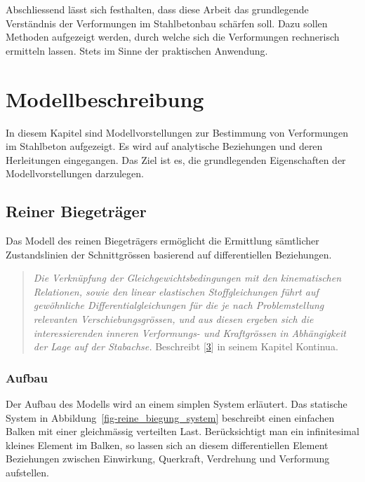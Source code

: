 \documentclass[
  12pt,
  letterpaper,
  egregdoesnotlikesansseriftitles]{scrreprt}
\begin{document}
Abschliessend lässt sich festhalten, dass diese Arbeit das grundlegende
Verständnis der Verformungen im Stahlbetonbau schärfen soll. Dazu sollen
Methoden aufgezeigt werden, durch welche sich die Verformungen
rechnerisch ermitteln lassen. Stets im Sinne der praktischen Anwendung.


\hypertarget{sec-modellbeschrieb}{%
\chapter{Modellbeschreibung}\label{sec-modellbeschrieb}}

In diesem Kapitel sind Modellvorstellungen zur Bestimmung von
Verformungen im Stahlbeton aufgezeigt. Es wird auf analytische
Beziehungen und deren Herleitungen eingegangen. Das Ziel ist es, die
grundlegenden Eigenschaften der Modellvorstellungen darzulegen.

\hypertarget{sec-kontinua}{%
\section{Reiner Biegeträger}\label{sec-kontinua}}

Das Modell des reinen Biegeträgers ermöglicht die Ermittlung sämtlicher
Zustandslinien der Schnittgrössen basierend auf differentiellen
Beziehungen.

\begin{quote}
\emph{Die Verknüpfung der Gleichgewichtsbedingungen mit den
kinematischen Relationen, sowie den linear elastischen Stoffgleichungen
führt auf gewöhnliche Differentialgleichungen für die je nach
Problemstellung relevanten Verschiebungsgrössen, und aus diesen ergeben
sich die interessierenden inneren Verformungs- und Kraftgrössen in
Abhängigkeit der Lage auf der Stabachse.} Beschreibt
{[}\protect\hyperlink{ref-Marti}{3}{]} in seinem Kapitel Kontinua.
\end{quote}

\hypertarget{aufbau}{%
\subsection{Aufbau}\label{aufbau}}

Der Aufbau des Modells wird an einem simplen System erläutert. Das
statische System in Abbildung~\ref{fig-reine_biegung_system} beschreibt
einen einfachen Balken mit einer gleichmässig verteilten Last.
Berücksichtigt man ein infinitesimal kleines Element im Balken, so
lassen sich an diesem differentiellen Element Beziehungen zwischen
Einwirkung, Querkraft, Verdrehung und Verformung aufstellen.
\end{document}
